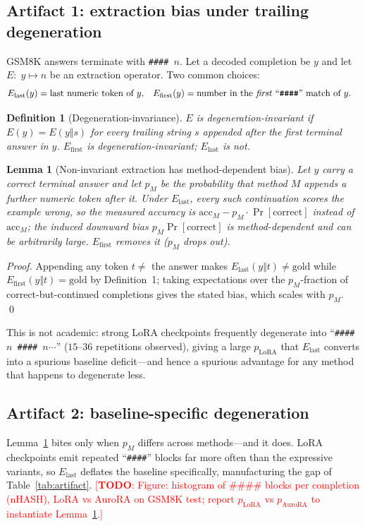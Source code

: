 \documentclass[preprint,11pt]{elsarticle}
\newcommand{\todo}[1]{\textcolor{red}{[\textbf{TODO}: #1]}}
\newtheorem{lemma}{Lemma}
\newtheorem{definition}{Definition}
\begin{document}
\subsection{Artifact 1: extraction bias under trailing degeneration}
GSM8K answers terminate with \texttt{\#\#\#\# $n$}. Let a decoded completion be $y$ and let $E:\;y\mapsto n$ be an
extraction operator. Two common choices:
\begin{align}
E_{\text{last}}(y)&=\text{last numeric token of }y, &
E_{\text{first}}(y)&=\text{number in the \emph{first} ``\texttt{\#\#\#\#}'' match of }y.
\end{align}
\begin{definition}[Degeneration-invariance]
$E$ is degeneration-invariant if $E(y)=E(y\Vert s)$ for every trailing string $s$ appended after the first terminal answer
in $y$. $E_{\text{first}}$ is degeneration-invariant; $E_{\text{last}}$ is not.
\end{definition}
\begin{lemma}[Non-invariant extraction has method-dependent bias]
\label{lem:bias}
Let $y$ carry a correct terminal answer and let $p_M$ be the probability that method $M$ appends a further numeric token
after it. Under $E_{\text{last}}$, every such continuation scores the example wrong, so the measured accuracy is
$\mathrm{acc}_M-p_M\!\cdot\!\Pr[\text{correct}]$ instead of $\mathrm{acc}_M$; the induced downward bias $p_M\Pr[\text{correct}]$
is method-dependent and can be arbitrarily large. $E_{\text{first}}$ removes it ($p_M$ drops out).
\end{lemma}
\begin{proof}
Appending any token $t\neq$ the answer makes $E_{\text{last}}(y\Vert t)\neq\text{gold}$ while $E_{\text{first}}(y\Vert t)=
\text{gold}$ by Definition~1; taking expectations over the $p_M$-fraction of correct-but-continued completions gives the
stated bias, which scales with $p_M$. \qed
\end{proof}
This is not academic: strong LoRA checkpoints frequently degenerate into ``\texttt{\#\#\#\# $n$ \#\#\#\# $n$}$\cdots$''
($15$--$36$ repetitions observed), giving a large $p_{\text{LoRA}}$ that $E_{\text{last}}$ converts into a spurious
baseline deficit---and hence a spurious advantage for any method that happens to degenerate less.

\subsection{Artifact 2: baseline-specific degeneration}
Lemma~\ref{lem:bias} bites only when $p_M$ differs across methods---and it does. LoRA checkpoints emit repeated
``\texttt{\#\#\#\#}'' blocks far more often than the expressive variants, so $E_{\text{last}}$ deflates the baseline
specifically, manufacturing the gap of Table~\ref{tab:artifact}. \todo{Figure: histogram of \#\#\#\# blocks per completion
(nHASH), LoRA vs AuroRA on GSM8K test; report $p_{\text{LoRA}}$ vs $p_{\text{AuroRA}}$ to instantiate Lemma~\ref{lem:bias}.}
\end{document}

